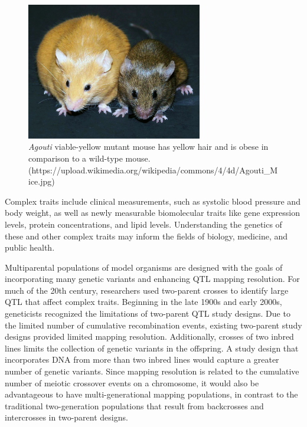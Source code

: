 \documentclass[]{article}\usepackage[]{graphicx}\usepackage[]{color}
\begin{document}
\begin{figure}
\includegraphics[height=6cm]{figs/Agouti.jpg}
\caption{\emph{Agouti} viable-yellow mutant mouse has yellow hair and is obese in comparison to a wild-type mouse. \tiny{(https://upload.wikimedia.org/wikipedia/commons/4/4d/Agouti\_Mice.jpg)}}
\label{fig:agouti}
\end{figure}



Complex traits include
clinical measurements, such as systolic blood pressure and body weight, as
well as newly measurable biomolecular traits like gene expression
levels, protein concentrations, and lipid levels.
Understanding the
genetics of these and other complex traits may inform the fields of biology,
medicine, and public health.




Multiparental populations of model organisms are designed with the goals of 
incorporating many genetic variants and enhancing QTL mapping resolution.
For much of the 20th century, researchers used two-parent crosses to identify large QTL that affect complex traits. 
Beginning in the late 1900s and early 2000s, geneticists recognized the limitations 
of two-parent QTL study designs. 
Due to the limited number of cumulative recombination events, existing two-parent study designs provided limited mapping resolution. 
Additionally, crosses of two inbred lines limits the collection of genetic variants in the offspring.
A study design that incorporates DNA from more than two inbred lines would capture a greater number of genetic variants. 
Since mapping resolution is related to the cumulative number of meiotic crossover 
events on a chromosome, it would also be advantageous to have multi-generational mapping
populations, in contrast to the traditional two-generation populations
that result from backcrosses and intercrosses in two-parent designs.
\end{document}
